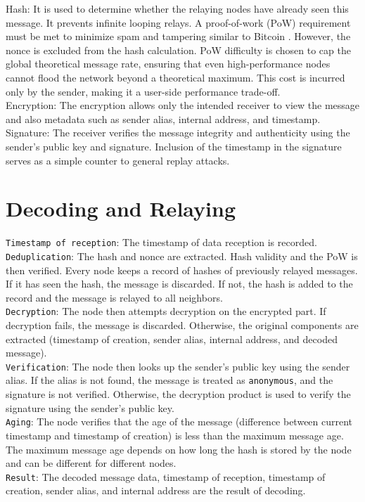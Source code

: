 \documentclass{article}
\begin{document}
Hash: It is used to determine whether the relaying nodes have already seen this message. It prevents infinite looping relays. A proof-of-work (PoW) requirement must be met to minimize spam and tampering similar to Bitcoin \cite{bitcoin2008}. 
However, the nonce is excluded from the hash calculation.
PoW difficulty is chosen to cap the global theoretical message rate, ensuring that even high-performance nodes cannot flood the network beyond a theoretical maximum. This cost is incurred only by the sender, making it a user-side performance trade-off.\\
Encryption: The encryption allows only the intended receiver to view the message and also metadata such as sender alias, internal address, and timestamp.\\
Signature: The receiver verifies the message integrity and authenticity using the sender’s public key and signature. Inclusion of the timestamp in the signature serves as a simple counter to general replay attacks.


\section{Decoding and Relaying}

\texttt{Timestamp of reception}: The timestamp of data reception is recorded.\\
\texttt{Deduplication}: The hash and nonce are extracted. Hash validity and the PoW is then verified. Every node keeps a record of hashes of previously relayed messages. If it has seen the hash, the message is discarded. If not, the hash is added to the record and the message is relayed to all neighbors.\\
\texttt{Decryption}: The node then attempts decryption on the encrypted part. If decryption fails, the message is discarded. Otherwise, the original components are extracted (timestamp of creation, sender alias, internal address, and decoded message).\\
\texttt{Verification}: The node then looks up the sender’s public key using the sender alias. If the alias is not found, the message is treated as \texttt{anonymous}, and the signature is not verified. Otherwise, the decryption product is used to verify the signature using the sender’s public key.\\
\texttt{Aging}: The node verifies that the age of the message (difference between current timestamp and timestamp of creation) is less than the maximum message age. The maximum message age depends on how long the hash is stored by the node and can be different for different nodes.\\
\texttt{Result}: The decoded message data, timestamp of reception, timestamp of creation, sender alias, and internal address are the result of decoding.
\end{document}
